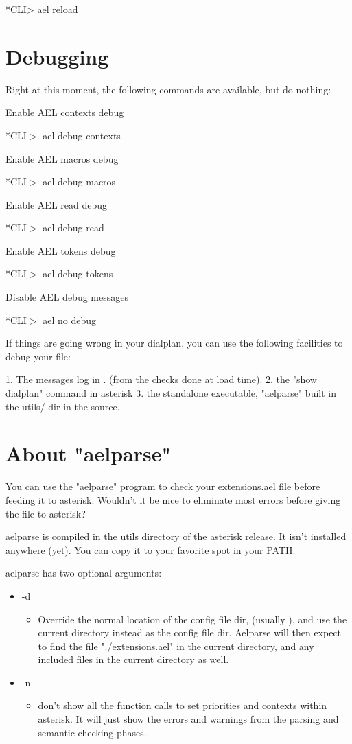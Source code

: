     *CLI> ael reload

\section{Debugging}

Right at this moment, the following commands are available, but do
nothing:

Enable AEL contexts debug

   *CLI$>$ ael debug contexts

Enable AEL macros debug

   *CLI$>$ ael debug macros

Enable AEL read debug

   *CLI$>$ ael debug read

Enable AEL tokens debug

   *CLI$>$ ael debug tokens

Disable AEL debug messages

   *CLI$>$ ael no debug

If things are going wrong in your dialplan, you can use the following
facilities to debug your file:

1. The messages log in . (from the checks done at load time).
2. the "show dialplan" command in asterisk
3. the standalone executable, "aelparse" built in the utils/ dir in the source.


\section{About "aelparse"}

You can use the "aelparse" program to check your extensions.ael
file before feeding it to asterisk. Wouldn't it be nice to eliminate
most errors before giving the file to asterisk?

aelparse is compiled in the utils directory of the asterisk release.
It isn't installed anywhere (yet). You can copy it to your favorite
spot in your PATH.

aelparse has two optional arguments:

\begin{itemize}
  \item -d
  \begin{itemize}
    \item Override the normal location of the config file dir, (usually
       ), and use the current directory instead as the
       config file dir. Aelparse will then expect to find the file
       "./extensions.ael" in the current directory, and any included
       files in the current directory as well.
  \end{itemize}
  \item -n
  \begin{itemize}
    \item don't show all the function calls to set priorities and contexts
       within asterisk. It will just show the errors and warnings from
       the parsing and semantic checking phases.
  \end{itemize}
\end{itemize}

